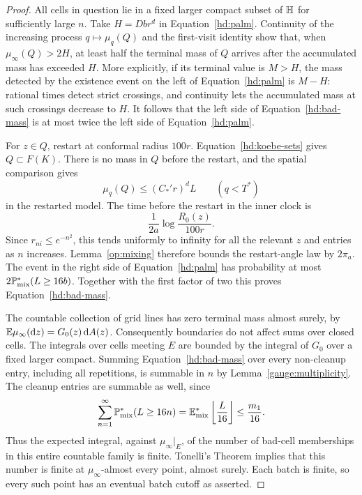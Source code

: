 \begin{proof}
All cells in question lie in a fixed larger compact subset of
\(\mathbb H\) for sufficiently large \(n\).
Take \(H=Dbr^d\) in Equation~\eqref{hd:palm}.
Continuity of the increasing process \(q\mapsto\mu_q(Q)\) and
the first-visit identity show that, when \(\mu_\infty(Q)>2H\),
at least half the terminal mass of \(Q\) arrives after the
accumulated mass has exceeded \(H\).
More explicitly, if its terminal value is \(M>H\), the mass
detected by the existence event on the left of
Equation~\eqref{hd:palm} is \(M-H\): rational times detect strict
crossings, and continuity lets the accumulated mass at such
crossings decrease to \(H\).
It follows that the left side of Equation~\eqref{hd:bad-mass}
is at most twice the left side of Equation~\eqref{hd:palm}.

For \(z\in Q\), restart at conformal radius \(100r\).
Equation~\eqref{hd:koebe-sets} gives \(Q\subset F(K)\).
There is no mass in \(Q\) before the restart, and the spatial
comparison gives
\[
 \mu_q(Q)\le (C_*'r)^dL\qquad(q<T^*)
\]
in the restarted model. The time before the restart in the inner
clock is
\[
 \frac{1}{2a}\log\frac{R_0(z)}{100r}.
\]
Since \(r_{ni}\le e^{-n^2}\), this tends uniformly to infinity for
all the relevant \(z\) and entries as \(n\) increases.
Lemma~\ref{op:mixing} therefore bounds the restart-angle law by
\(2\pi_a\). The event in the right side of
Equation~\eqref{hd:palm} has probability at most
\(2\mathbb P^*_{\mathrm{mix}}(L\ge16b)\).
Together with the first factor of two this proves
Equation~\eqref{hd:bad-mass}.

The countable collection of grid lines has zero terminal mass
almost surely, by
\(\mathbb E\mu_\infty(\mathop{}\!\mathrm{d} z)=G_0(z)\mathop{}\!\mathrm{d} A(z)\).
Consequently boundaries do not affect sums over closed cells.
The integrals over cells meeting \(E\) are bounded by the integral
of \(G_0\) over a fixed larger compact. Summing
Equation~\eqref{hd:bad-mass} over every non-cleanup entry,
including all repetitions, is summable in \(n\) by
Lemma~\ref{gauge:multiplicity}.
The cleanup entries are summable as well, since
\begin{equation}
 \sum_{n=1}^{\infty}\mathbb P^*_{\mathrm{mix}}(L\ge16n)
 =\mathbb E^*_{\mathrm{mix}}\left\lfloor\frac{L}{16}\right\rfloor
 \le\frac{m_1}{16}.
 \label{hd:cleanup-tail}
\end{equation}
Thus the expected integral, against \(\mu_\infty|_E\), of the
number of bad-cell memberships in this entire countable family
is finite. Tonelli's Theorem implies that this number is finite
at \(\mu_\infty\)-almost every point, almost surely.
Each batch is finite, so every such point has an eventual batch
cutoff as asserted.
\end{proof}

